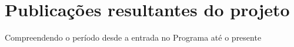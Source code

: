 \chapter{Publicações resultantes do projeto}

Compreendendo o período desde a entrada no Programa até o presente
